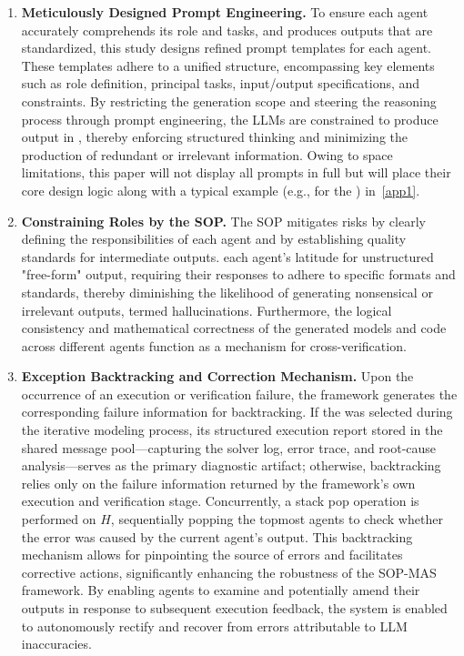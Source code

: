 \documentclass[preprint,12pt]{elsarticle}
\begin{document}
\begin{enumerate}[label=\arabic*)]
 \item \textbf{Meticulously Designed Prompt Engineering.} To ensure each agent accurately comprehends its role and tasks, and produces outputs that are standardized, this study designs refined prompt templates for each agent. These templates adhere to a unified structure, encompassing key elements such as role definition, principal tasks, input/output specifications, and constraints. By restricting the generation scope and steering the reasoning process through prompt engineering, the LLMs are constrained to produce output in , thereby enforcing structured thinking and minimizing the production of redundant or irrelevant information. Owing to space limitations, this paper will not display all prompts in full but will place their core design logic along with a typical example (e.g., for the ) in~\ref{app1}.
 \item \textbf{Constraining Roles by the SOP.} The SOP mitigates risks by clearly defining the responsibilities of each agent and by establishing quality standards for intermediate outputs.  each agent's latitude for unstructured "free-form" output, requiring their responses to adhere to specific formats and standards, thereby diminishing the likelihood of generating nonsensical or irrelevant outputs, termed hallucinations. Furthermore, the logical consistency and mathematical correctness of the generated models and code across different agents function as a mechanism for cross-verification.
 \item \textbf{Exception Backtracking and Correction Mechanism.} Upon the occurrence of an execution or verification failure, the framework generates the corresponding failure information for backtracking. If the  was selected during the iterative modeling process, its structured execution report stored in the shared message pool—capturing the solver log, error trace, and root-cause analysis—serves as the primary diagnostic artifact; otherwise, backtracking relies only on the failure information returned by the framework's own execution and verification stage. Concurrently, a stack pop operation is performed on $H$, sequentially popping the topmost agents to check whether the error was caused by the current agent's output. This backtracking mechanism allows for pinpointing the source of errors and facilitates corrective actions, significantly enhancing the robustness of the SOP-MAS framework. By enabling agents to examine and potentially amend their outputs in response to subsequent execution feedback, the system is enabled to autonomously rectify and recover from errors attributable to LLM inaccuracies.
\end{enumerate}
\end{document}
